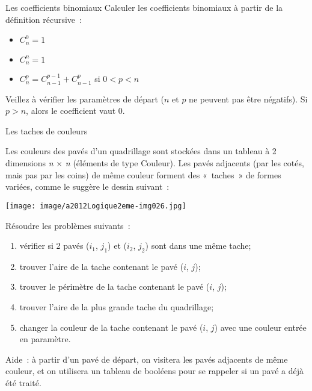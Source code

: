 	\begin{Exercice}{Les coefficients binomiaux}
		Calculer les coefficients binomiaux à partir de la définition récursive~:

		\begin{itemize}
			\item 
				$C_n^0=1$
			\item 
				$C_n^n=1$
			\item 
			 $C_n^p=C_{n-1}^{p-1}+C_{n-1}^p$ si $0<p<n$
		\end{itemize}

		Veillez à vérifier les paramètres de départ ($n$ et $p$ 
		ne peuvent pas être négatifs). Si $p>n$, alors le coefficient vaut $0$.
	\end{Exercice}
	
	\begin{Exercice}{Les taches de couleurs}

		Les couleurs des pavés d'un quadrillage sont stockées dans un tableau 
		à 2 dimensions \textit{n} ${\times}$ \textit{n} (éléments de type Couleur). 
		Les pavés adjacents (par les cotés, mais pas par les coins) de même 
		couleur forment des «~taches~» de formes variées, comme le suggère 
		le dessin suivant~:
		\begin{center}
		\texttt{[image: image/a2012Logique2eme-img026.jpg]}
		\end{center}
		
		Résoudre les problèmes suivants~:

		\begin{enumerate}
			\item {
				vérifier si 2 pavés ($i_1$, $j_1$) et ($i_2$, $j_2$) 
				sont dans une même tache;}
			\item {
				trouver l'aire de la tache contenant le pavé ($i$, $j$);}
			\item {
				trouver le périmètre de la tache contenant le pavé ($i$, $j$);}
			\item {
				trouver l'aire de la plus grande tache du quadrillage;}
			\item {
				changer la couleur de la tache contenant le pavé ($i$, $j$) 
				avec une couleur entrée en paramètre.}
		\end{enumerate}
		
		Aide~: à partir d'un pavé de départ, on visitera les pavés 
		adjacents de même couleur, et on utilisera un tableau de
		booléens pour se rappeler si un pavé a déjà été traité.
	\end{Exercice}
	
